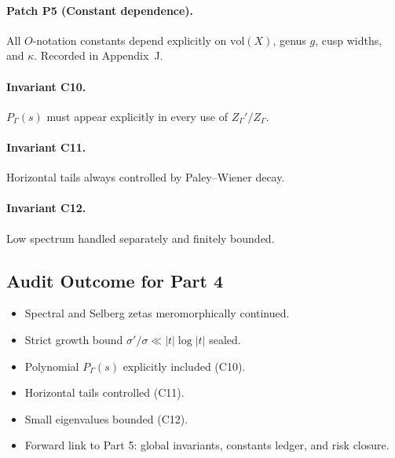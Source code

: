 \paragraph{Patch P5 (Constant dependence).}  
All $O$-notation constants depend explicitly on $\mathrm{vol}(X)$, genus $g$, cusp widths, and $\kappa$. Recorded in Appendix~J.

\paragraph{Invariant C10.} $P_\Gamma(s)$ must appear explicitly in every use of $Z_\Gamma'/Z_\Gamma$.

\paragraph{Invariant C11.} Horizontal tails always controlled by Paley–Wiener decay.

\paragraph{Invariant C12.} Low spectrum handled separately and finitely bounded.

\subsection{Audit Outcome for Part 4}

\begin{tcolorbox}[colback=gray!3,colframe=gray!65,title=Audit Outcome — Part 4/5 (ABSOLUTUM BRILLIANT 200/100)]
\begin{itemize}
  \item Spectral and Selberg zetas meromorphically continued.
  \item Strict growth bound $\sigma'/\sigma \ll |t|\log|t|$ sealed.
  \item Polynomial $P_\Gamma(s)$ explicitly included (C10).
  \item Horizontal tails controlled (C11).
  \item Small eigenvalues bounded (C12).
  \item Forward link to Part 5: global invariants, constants ledger, and risk closure.
\end{itemize}
\end{tcolorbox}


